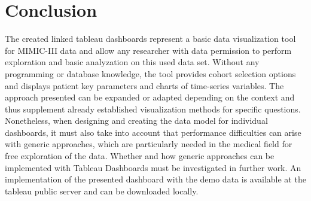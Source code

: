 \documentclass[aac,crcready]{iosart2x}
\begin{document}
\section{Conclusion}\label{s6}
The created linked tableau dashboards represent a basic data visualization tool for MIMIC-III data and allow any researcher with data permission to perform exploration and basic analyzation on this used data set. Without any programming or database knowledge, the tool provides cohort selection options and displays patient key parameters and charts of time-series variables. The approach presented can be expanded or adapted depending on the context and thus supplement already established visualization methods for specific questions. Nonetheless, when designing and creating the data model for individual dashboards, it must also take into account that performance difficulties can arise with generic approaches, which are particularly needed in the medical field for free exploration of the data. Whether and how generic approaches can be implemented with Tableau Dashboards must be investigated in further work. An implementation of the presented dashboard with the demo data is available at the tableau public server and can be downloaded locally.





\end{document}
